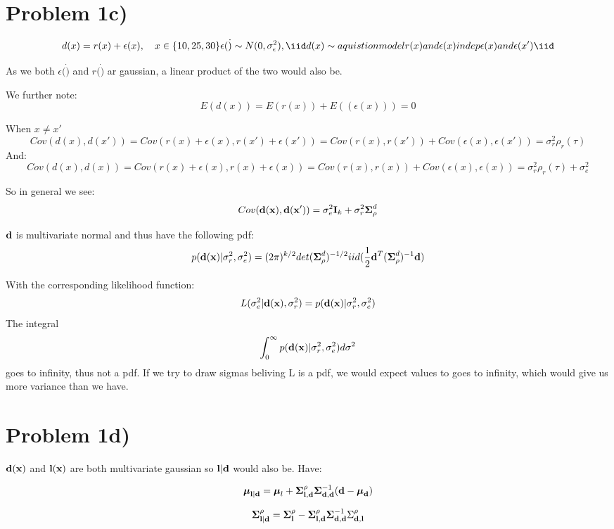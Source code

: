 \documentclass[]{article}
\begin{document}
\section{Problem 1c)}\label{problem-1c}

\begin{equation*}
   d(x) = r(x) + \epsilon(x), \quad x \in \lbrace 10, 25, 30 \rbrace \\
   \epsilon(\dot) \sim N(0, \sigma_\epsilon^2), \iid \\
   d(x) \sim aquistion model \\
   r(x) and \epsilon(x) indep \\
   \epsilon(x) and \epsilon(x') \iid  \\
\end{equation*}

As we both \(\epsilon(\dot)\) and \(r(\dot)\) ar gaussian, a linear
product of the two would also be.

We further note: \[E(d(x)) = E(r(x)) + E((\epsilon(x))) = 0\]

When \(x\neq x'\)
\[Cov(d(x), d(x')) = Cov(r(x)+\epsilon(x), r(x') + \epsilon(x')) = Cov(r(x), r(x')) + Cov(\epsilon(x), \epsilon(x')) = \sigma_r^2\rho_r(\tau)\]
And:
\[Cov(d(x), d(x)) = Cov(r(x)+\epsilon(x), r(x) + \epsilon(x)) = Cov(r(x), r(x)) + Cov(\epsilon(x), \epsilon(x)) = \sigma_r^2\rho_r(\tau) + \sigma_e^2\]

So in general we see:
\[Cov(\boldsymbol{\mathbf{d}}(\boldsymbol{\mathbf{x}}), \boldsymbol{\mathbf{d}}(\boldsymbol{\mathbf{x}}')) = \sigma^2_e \boldsymbol{\mathbf{I}}_k +\sigma^2_r\boldsymbol{\mathbf{\Sigma}}_\rho^d\]

\(\boldsymbol{\mathbf{d}}\) is multivariate normal and thus have the following pdf:
\[p(\boldsymbol{\mathbf{d}}(\boldsymbol{\mathbf{x}})|\sigma_r^2, \sigma_e^2) = (2\pi)^{k/2}det(\boldsymbol{\mathbf{\Sigma}}_\rho^d)^{-1/2}iid(\frac{1}{2}\boldsymbol{\mathbf{d}}^T(\boldsymbol{\mathbf{\Sigma}}_\rho^d)^{-1}\boldsymbol{\mathbf{d}})\]

With the corresponding likelihood function:
\[L(\sigma_e^2 | \boldsymbol{\mathbf{d}}(\boldsymbol{\mathbf{x}}), \sigma_r^2)=p(\boldsymbol{\mathbf{d}}(\boldsymbol{\mathbf{x}})|\sigma_r^2, \sigma_e^2)\]
The integral
\[\int_{0}^{\infty}p(\boldsymbol{\mathbf{d}}(\boldsymbol{\mathbf{x}})|\sigma_r^2, \sigma_e^2) d\sigma^2\]
goes to infinity, thus not a pdf. If we try to draw sigmas beliving L is
a pdf, we would expect values to goes to infinity, which would give us
more variance than we have.

\section{Problem 1d)}\label{problem-1d}

\(\boldsymbol{\mathbf{d}}(\boldsymbol{\mathbf{x}})\) and \(\boldsymbol{\mathbf{l}}(\boldsymbol{\mathbf{x}})\) are both multivariate
gaussian so \(\boldsymbol{\mathbf{l}} | \boldsymbol{\mathbf{d}}\) would also be. Have:

\[
  \boldsymbol{\mathbf{\mu}}_{\boldsymbol{\mathbf{l}} | \boldsymbol{\mathbf{d}}} = \boldsymbol{\mathbf{\mu}}_l + \boldsymbol{\mathbf{\Sigma}}_{\boldsymbol{\mathbf{l}}, \boldsymbol{\mathbf{d}}}^\rho \boldsymbol{\mathbf{\Sigma}}_{\boldsymbol{\mathbf{d}}, \boldsymbol{\mathbf{d}}}^{-1}(\boldsymbol{\mathbf{d}} - \boldsymbol{\mathbf{\mu}}_{\boldsymbol{\mathbf{d}}})
\]

\[
  \boldsymbol{\mathbf{\Sigma}}_{\boldsymbol{\mathbf{l}} | \boldsymbol{\mathbf{d}}}^\rho = \boldsymbol{\mathbf{\Sigma}}_{\boldsymbol{\mathbf{l}}}^\rho - \boldsymbol{\mathbf{\Sigma}}_{\boldsymbol{\mathbf{l}}, \boldsymbol{\mathbf{d}}}^\rho \boldsymbol{\mathbf{\Sigma}}_{\boldsymbol{\mathbf{d}}, \boldsymbol{\mathbf{d}}}^{-1}\Sigma_{\boldsymbol{\mathbf{d}}, \boldsymbol{\mathbf{l}}}^\rho
\]
\end{document}
